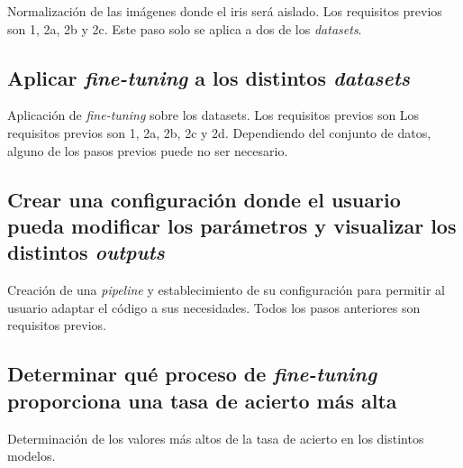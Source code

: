 Normalización de las imágenes donde el iris será aislado. Los requisitos previos son 1, 2a, 2b y 2c. Este paso solo se aplica a dos de los \textit{datasets}.

\subsection{Aplicar \textit{fine-tuning} a los distintos \textit{datasets}}

Aplicación de \textit{fine-tuning} sobre los datasets. Los requisitos previos son  Los requisitos previos son 1, 2a, 2b, 2c y 2d. Dependiendo del conjunto de datos, alguno de los pasos previos puede no ser necesario.

\subsection{Crear una configuración donde el usuario pueda modificar los parámetros y visualizar los distintos \textit{outputs}}

Creación de una \textit{pipeline} y establecimiento de su configuración para permitir al usuario adaptar el código a sus necesidades. Todos los pasos anteriores son requisitos previos.

\subsection{Determinar qué proceso de \textit{fine-tuning} proporciona una tasa de acierto más alta}

Determinación de los valores más altos de la tasa de acierto en los distintos modelos.



